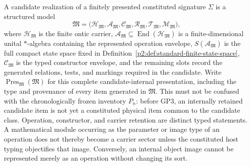 \documentclass[12pt,a4paper]{article}
\begin{document}
\begin{definition}
\label{p2:def:structured-role-realization}
A candidate realization of a finitely presented constituted signature
\(\Sigma\) is a structured model
\[
 \mathfrak M
 =\bigl(\mathcal H_{\mathfrak M},\mathcal A_{\mathfrak M},
          \mathcal C_{\mathfrak M},\mathcal R_{\mathfrak M},
          \mathcal T_{\mathfrak M},\mathcal M_{\mathfrak M}\bigr),
\]
where \(\mathcal H_{\mathfrak M}\) is the finite ontic carrier,
\(\mathcal A_{\mathfrak M}\subseteq\operatorname{End}(\mathcal H_{\mathfrak M})\)
is a finite-dimensional unital \(*\)-algebra containing the represented
operation envelope, \(S(\mathcal A_{\mathfrak M})\) is the full compact state
space fixed in Definition~\ref{p2:def:standard-finite-state-space},
\(\mathcal C_{\mathfrak M}\) is the typed constructor envelope,
and the remaining slots record the generated relations, tests, and markings
required in the candidate.  Write
\(\operatorname{Pres}_{\mathfrak M}(\mathfrak M)\) for this complete
candidate-internal presentation, including the type and provenance of every
item generated in \(\mathfrak M\).  This must not be confused with the
chronologically frozen inventory \(P_n\): before GP3, an internally retained
candidate item is not yet a constituted physical item common to the candidate
class.  Operation, constructor, and carrier retention are distinct typed
statements.
A mathematical module occurring as the parameter or image type of an
operation does not thereby become a carrier sector unless the constituted
host typing objectifies that image.  Conversely, an internal object image
cannot be represented merely as an operation without changing its sort.


\end{definition}
\end{document}
